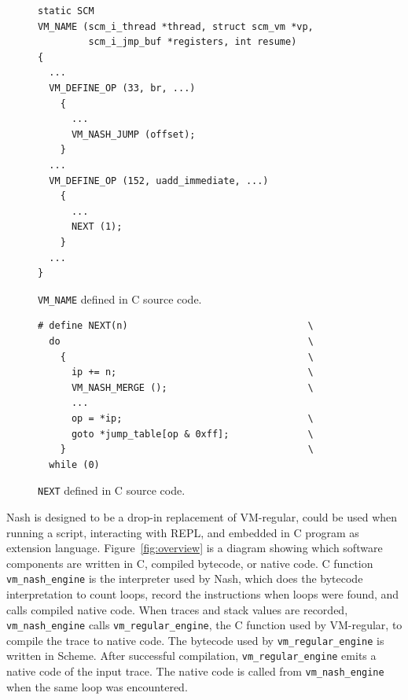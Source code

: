 \documentclass[preprint, numbers]{sigplanconf}
\begin{document}
\begin{figure}
  \centering
\begin{verbatim}
static SCM
VM_NAME (scm_i_thread *thread, struct scm_vm *vp,
         scm_i_jmp_buf *registers, int resume)
{
  ...
  VM_DEFINE_OP (33, br, ...)
    {
      ...
      VM_NASH_JUMP (offset);
    }
  ...
  VM_DEFINE_OP (152, uadd_immediate, ...)
    {
      ...
      NEXT (1);
    }
  ...
}
\end{verbatim}
\caption{\texttt{VM\_NAME} defined in C source code.}
\label{fig:vmname}
\end{figure}

\begin{figure}
\begin{verbatim}
# define NEXT(n)                                \
  do                                            \
    {                                           \
      ip += n;                                  \
      VM_NASH_MERGE ();                         \
      ...
      op = *ip;                                 \
      goto *jump_table[op & 0xff];              \
    }                                           \
  while (0)
\end{verbatim}
\caption{\texttt{NEXT} defined in C source code.}
\label{fig:cnext}
\end{figure}

Nash is designed to be a drop-in replacement of VM-regular, could be used when
running a script, interacting with REPL, and embedded in C program as
extension language. Figure~\hyperref[fig:overview]{\ref{fig:overview}} is a
diagram showing which software components are written in C, compiled bytecode,
or native code. C function \texttt{vm\_nash\_engine} is the interpreter used
by Nash, which does the bytecode interpretation to count loops, record the
instructions when loops were found, and calls compiled native code. When
traces and stack values are recorded, \texttt{vm\_nash\_engine} calls
\texttt{vm\_regular\_engine}, the C function used by VM-regular, to compile
the trace to native code. The bytecode used by \texttt{vm\_regular\_engine} is
written in Scheme. After successful compilation, \texttt{vm\_regular\_engine}
emits a native code of the input trace. The native code is called from
\texttt{vm\_nash\_engine} when the same loop was encountered.
\end{document}
